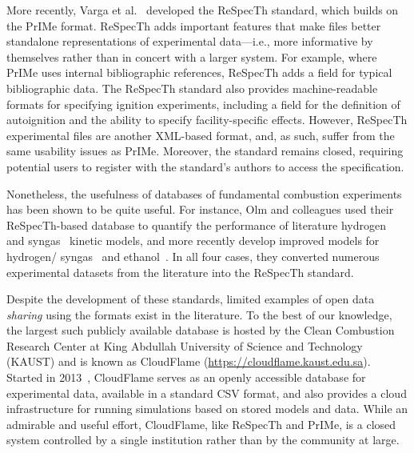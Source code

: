 \documentclass[12pt]{ijck}
\begin{document}
More recently, Varga et al.~\autocite{Varga2015a,Varga2015b} developed the
ReSpecTh standard, which builds on the PrIMe format. ReSpecTh adds important
features that make files better standalone representations of experimental
data---i.e., more informative by themselves rather than in concert with a larger
system. For example, where PrIMe uses internal bibliographic references,
ReSpecTh adds a field for typical bibliographic data. The ReSpecTh standard also
provides machine-readable formats for specifying ignition experiments, including
a field for the definition of autoignition and the ability to specify
facility-specific effects. However, ReSpecTh experimental files are another
XML-based format, and, as such, suffer from the same usability issues as PrIMe.
Moreover, the standard remains closed, requiring potential users to register
with the standard's authors to access the specification.

Nonetheless, the usefulness of databases of fundamental combustion experiments
has been shown to be quite useful. For instance, Olm and colleagues used their
ReSpecTh-based database to quantify the performance of literature
hydrogen~\autocite{Olm:2014gn} and syngas~\autocite{Olm:2015ch} kinetic models,
and more recently develop improved models for hydrogen\slash
syngas~\autocite{Varga:2016gj} and ethanol~\autocite{Olm:2016et}. In all four
cases, they converted numerous experimental datasets from the literature into
the ReSpecTh standard.

Despite the development of these standards, limited examples of open data
\emph{sharing} using the formats exist in the literature. To the best
of our knowledge, the largest such publicly available database is hosted by
the Clean Combustion Research Center at King Abdullah University of Science and
Technology (KAUST) and is known as CloudFlame
(\url{https://cloudflame.kaust.edu.sa}). Started in
2013~\autocite{Goteng:2013cf,Goteng:2014,ReynoChiasson:2015}, CloudFlame serves
as an openly accessible database for experimental data, available in a standard
CSV format, and also provides a cloud infrastructure for running simulations
based on stored models and data. While an admirable and useful effort,
CloudFlame, like ReSpecTh and PrIMe, is a closed system controlled by a single
institution rather than by the community at large.
\end{document}
